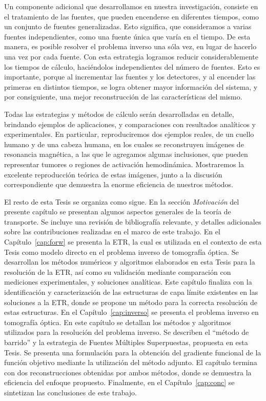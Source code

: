 Un componente adicional que desarrollamos en nuestra investigación, 
consiste en el tratamiento de las fuentes, que pueden encenderse 
en diferentes tiempos, como un conjunto de fuentes generalizadas. 
Esto significa, que consideramos a varias fuentes independientes, 
como una fuente única que varía en el tiempo. 
De esta manera, es posible resolver el problema 
inverso una sóla vez, en lugar de hacerlo una vez por cada fuente. 
Con esta estrategia logramos reducir considerablemente los tiempos de 
cálculo, haciéndolos independientes del número de fuentes. 
Esto es importante, porque al incrementar las fuentes y los 
detectores, y al encender las primeras en distintos tiempos, 
se logra obtener mayor información del sistema, y por consiguiente, 
una mejor reconstrucción de las características del mismo.

Todas las estrategias y métodos de cálculo serán desarrolladas 
en detalle, brindando ejemplos de aplicaciones, y comparaciones 
con resultados analíticos y experimentales. 
En particular, reproduciremos dos ejemplos reales, de un cuello 
humano y de una cabeza humana, en los 
cuales se reconstruyen imágenes de resonancia magnética, a las 
que le agregamos algunas inclusiones, que pueden representar 
tumores o regiones de activación hemodinámica.
Mostraremos la excelente reproducción teórica de estas imágenes, 
junto a la discusión correspondiente que demuestra la enorme 
eficiencia de nuestros métodos.

El resto de esta Tesis se organiza como sigue. 
En la sección {\em Motivación} del presente capítulo 
se presentan algunos aspectos 
generales de la teoría de transporte. Se incluye
 una revisión de bibliografía relevante, 
y detalles adicionales sobre las contribuciones realizadas en el marco de este trabajo.
En el Capítulo~\ref{cap:forw} se presenta 
la ETR, la cual es utilizada en el contexto 
de esta Tesis como modelo directo 
en el problema inverso de tomografía óptica. Se desarrollan 
los métodos numéricos y algoritmos elaborados en esta Tesis 
para la resolución de la ETR, así como su validación 
mediante comparación con mediciones experimentales, y soluciones analíticas. Este capítulo finaliza con la identificación y 
caracterización de las estructuras de capa límite existentes 
en las soluciones a la ETR, donde se propone un método para 
la correcta resolución de estas estructuras. 
En el Capítulo~\ref{cap:inverso} se presenta el problema inverso 
en tomografía óptica. En este capítulo se detallan los métodos 
y algoritmos utilizados para la resolución del problema inverso. 
Se describen el ``método de barrido'' y la estrategia de Fuentes Múltiples Superpuestas, propuesta en esta Tesis. 
Se presenta una formulación para la obtención del gradiente 
funcional de la función objetivo mediante la utilización del método adjunto. El capítulo termina con dos 
reconstrucciones obtenidas por ambos métodos, donde se demuestra 
la eficiencia del enfoque propuesto. Finalmente, en el Capítulo~\ref{cap:conc} se sintetizan las conclusiones de este trabajo.


